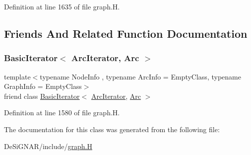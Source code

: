 Definition at line 1635 of file graph.\+H.



\subsection{Friends And Related Function Documentation}
\mbox{\label{class_designar_1_1_digraph_1_1_arc_iterator_a530ad7c7218fa9b74a5cce004d0e3a1c}} 
\subsubsection{\texorpdfstring{Basic\+Iterator$<$ Arc\+Iterator, Arc $>$}{BasicIterator< ArcIterator, Arc >}}
{\footnotesize\ttfamily template$<$typename Node\+Info , typename Arc\+Info  = Empty\+Class, typename Graph\+Info  = Empty\+Class$>$ \\
friend class \hyperlink{class_designar_1_1_basic_iterator}{Basic\+Iterator}$<$ \hyperlink{class_designar_1_1_digraph_1_1_arc_iterator}{Arc\+Iterator}, \hyperlink{class_designar_1_1_digraph_a0ceb278671f2a535c00fddccdeafd69f}{Arc} $>$\hspace{0.3cm}{\ttfamily [friend]}}



Definition at line 1580 of file graph.\+H.



The documentation for this class was generated from the following file\+:\begin{DoxyCompactItemize}
\item 
De\+Si\+G\+N\+A\+R/include/\hyperlink{graph_8_h}{graph.\+H}\end{DoxyCompactItemize}
